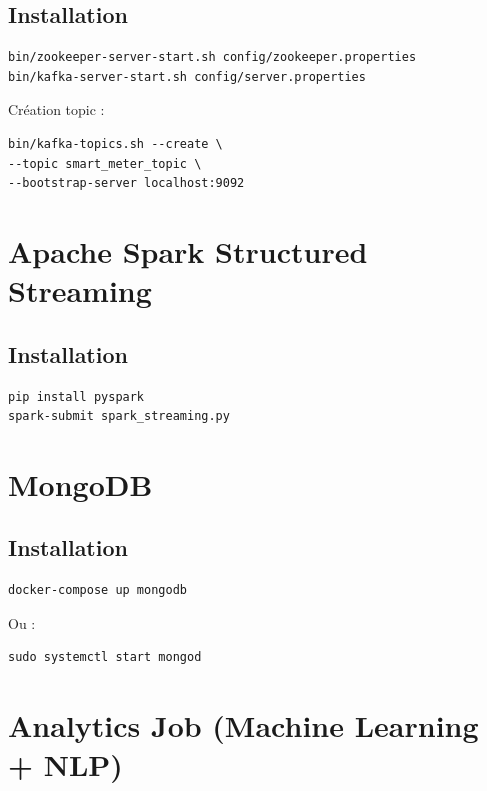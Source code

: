 \documentclass[12pt,a4paper]{report}
\begin{document}
\subsection{Installation}

\begin{verbatim}
bin/zookeeper-server-start.sh config/zookeeper.properties
bin/kafka-server-start.sh config/server.properties
\end{verbatim}

Création topic :

\begin{verbatim}
bin/kafka-topics.sh --create \
--topic smart_meter_topic \
--bootstrap-server localhost:9092
\end{verbatim}

\section{Apache Spark Structured Streaming}

\subsection{Installation}

\begin{verbatim}
pip install pyspark
spark-submit spark_streaming.py
\end{verbatim}

\section{MongoDB}

\subsection{Installation}

\begin{verbatim}
docker-compose up mongodb
\end{verbatim}

Ou :

\begin{verbatim}
sudo systemctl start mongod
\end{verbatim}

\section{Analytics Job (Machine Learning + NLP)}
\end{document}
